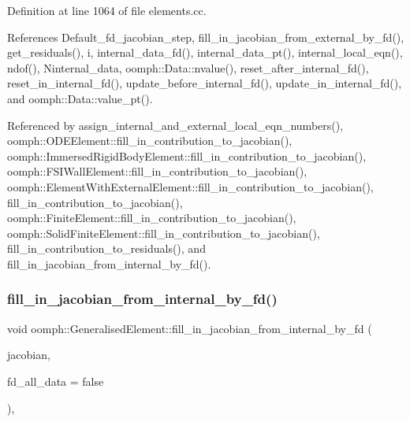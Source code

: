 Definition at line 1064 of file elements.\+cc.



References Default\+\_\+fd\+\_\+jacobian\+\_\+step, fill\+\_\+in\+\_\+jacobian\+\_\+from\+\_\+external\+\_\+by\+\_\+fd(), get\+\_\+residuals(), i, internal\+\_\+data\+\_\+fd(), internal\+\_\+data\+\_\+pt(), internal\+\_\+local\+\_\+eqn(), ndof(), Ninternal\+\_\+data, oomph\+::\+Data\+::nvalue(), reset\+\_\+after\+\_\+internal\+\_\+fd(), reset\+\_\+in\+\_\+internal\+\_\+fd(), update\+\_\+before\+\_\+internal\+\_\+fd(), update\+\_\+in\+\_\+internal\+\_\+fd(), and oomph\+::\+Data\+::value\+\_\+pt().



Referenced by assign\+\_\+internal\+\_\+and\+\_\+external\+\_\+local\+\_\+eqn\+\_\+numbers(), oomph\+::\+O\+D\+E\+Element\+::fill\+\_\+in\+\_\+contribution\+\_\+to\+\_\+jacobian(), oomph\+::\+Immersed\+Rigid\+Body\+Element\+::fill\+\_\+in\+\_\+contribution\+\_\+to\+\_\+jacobian(), oomph\+::\+F\+S\+I\+Wall\+Element\+::fill\+\_\+in\+\_\+contribution\+\_\+to\+\_\+jacobian(), oomph\+::\+Element\+With\+External\+Element\+::fill\+\_\+in\+\_\+contribution\+\_\+to\+\_\+jacobian(), fill\+\_\+in\+\_\+contribution\+\_\+to\+\_\+jacobian(), oomph\+::\+Finite\+Element\+::fill\+\_\+in\+\_\+contribution\+\_\+to\+\_\+jacobian(), oomph\+::\+Solid\+Finite\+Element\+::fill\+\_\+in\+\_\+contribution\+\_\+to\+\_\+jacobian(), fill\+\_\+in\+\_\+contribution\+\_\+to\+\_\+residuals(), and fill\+\_\+in\+\_\+jacobian\+\_\+from\+\_\+internal\+\_\+by\+\_\+fd().

\mbox{\label{classoomph_1_1GeneralisedElement_a30caea3a6e2f41b2149f5cae2a1feb30}} 
\subsubsection{\texorpdfstring{fill\+\_\+in\+\_\+jacobian\+\_\+from\+\_\+internal\+\_\+by\+\_\+fd()}{fill\_in\_jacobian\_from\_internal\_by\_fd()}\hspace{0.1cm}{\footnotesize\ttfamily [2/2]}}
{\footnotesize\ttfamily void oomph\+::\+Generalised\+Element\+::fill\+\_\+in\+\_\+jacobian\+\_\+from\+\_\+internal\+\_\+by\+\_\+fd (\begin{DoxyParamCaption}\item[{\hyperlink{classoomph_1_1DenseMatrix}{Dense\+Matrix}$<$ double $>$ \&}]{jacobian,  }\item[{const bool \&}]{fd\+\_\+all\+\_\+data = {\ttfamily false} }\end{DoxyParamCaption})\hspace{0.3cm}{\ttfamily [inline]}, {\ttfamily [protected]}}



